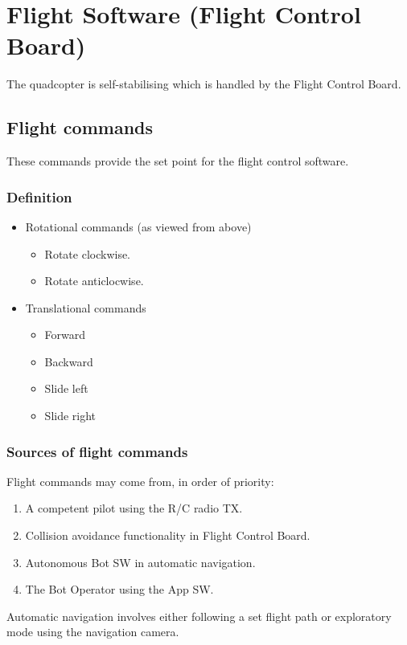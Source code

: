 \documentclass[a4paper]{article}
\begin{document}
\section{Flight Software (Flight Control Board)}
The quadcopter is self-stabilising which is handled by the Flight Control Board.

  \subsection{Flight commands}
  These commands provide the set point for the flight control software.
  \subsubsection{Definition}
  \label{sec:flightcmd-definition}
  \begin{itemize}
    \item Rotational commands (as viewed from above)
      \begin{itemize}
        \item Rotate clockwise.
        \item Rotate anticlocwise.
      \end{itemize}
      \item Translational commands
        \begin{itemize}
          \item Forward
          \item Backward
          \item Slide left
          \item Slide right
        \end{itemize}
  \end{itemize}

  \subsubsection{Sources of flight commands}
  \label{sec:flight-cmd-src}
  Flight commands may come from, in order of priority:
  \begin{enumerate}
    \item A competent pilot using the R/C radio TX.
    \item Collision avoidance functionality in Flight Control Board.
    \item Autonomous Bot SW in automatic navigation.
    \item The Bot Operator using the App SW.
  \end{enumerate}
  Automatic navigation involves either following a set flight path or exploratory mode using the navigation camera.
\end{document}
